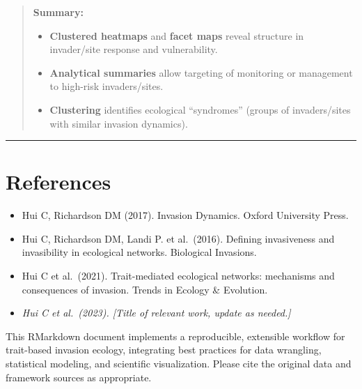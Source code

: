 \documentclass[
]{article}
\providecommand{\tightlist}{%
  \setlength{\itemsep}{0pt}\setlength{\parskip}{0pt}}
\begin{document}
\begin{quote}
\textbf{Summary:}

\begin{itemize}
\tightlist
\item
  \textbf{Clustered heatmaps} and \textbf{facet maps} reveal structure
  in invader/site response and vulnerability.
\item
  \textbf{Analytical summaries} allow targeting of monitoring or
  management to high-risk invaders/sites.
\item
  \textbf{Clustering} identifies ecological ``syndromes'' (groups of
  invaders/sites with similar invasion dynamics).
\end{itemize}
\end{quote}

\begin{center}\rule{0.5\linewidth}{0.5pt}\end{center}

\hypertarget{references}{%
\section{References}\label{references}}

\begin{itemize}
\tightlist
\item
  Hui C, Richardson DM (2017). Invasion Dynamics. Oxford University
  Press.
\item
  Hui C, Richardson DM, Landi P. et al.~(2016). Defining invasiveness
  and invasibility in ecological networks. Biological Invasions.
\item
  Hui C et al.~(2021). Trait-mediated ecological networks: mechanisms
  and consequences of invasion. Trends in Ecology \& Evolution.
\item
  \emph{Hui C et al.~(2023). {[}Title of relevant work, update as
  needed.{]}}
\end{itemize}

This RMarkdown document implements a reproducible, extensible workflow
for trait-based invasion ecology, integrating best practices for data
wrangling, statistical modeling, and scientific visualization. Please
cite the original data and framework sources as appropriate.
\end{document}
